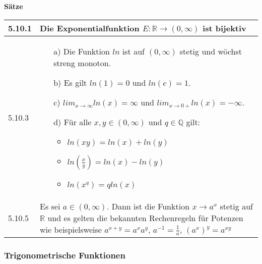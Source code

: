     \noindent 
    \textbf{Sätze}
    \begin{table}[H]
    \begin{tabularx}{\textwidth}{X m{16cm}}
        \toprule

        5.10.1& Die Exponentialfunktion $E: \mathbb{R} \rightarrow (0,\infty)$ ist \textbf{bijektiv} \\
        \midrule
        5.10.3& \begin{itemize}
                    \item[a)] Die Funktion $ln$ ist auf $(0, \infty)$ stetig und wöchst streng monoton.
                    \item[b)] Es gilt $ln(1) = 0$ und $ln(e) = 1$.
                    \item[c)] $lim_{x \rightarrow \infty} ln(x) = \infty$ und $lim_{x \rightarrow 0+} ln(x) = -\infty$.
                    \item[d)] Für alle $x, y \in (0, \infty)$ und $q \in \mathbb{Q}$ gilt:
                                \begin{itemize}
                                    \item $ln(xy) = ln(x) + ln(y)$
                                    \item $ln(\frac{x}{y}) = ln(x) - ln(y)$
                                    \item $ln(x^q) = q ln(x)$
                                \end{itemize} 
                \end{itemize} \\
        \midrule
        5.10.5& Es sei $a \in (0,\infty)$. Dann ist die Funktion $x \rightarrow a^x$ stetig auf $\mathbb{R}$ und es gelten die bekannten
                Rechenregeln für Potenzen wie beispielsweise $a^{x+y}=a^xa^y$, $a^{-1}=\frac{1}{a}$, $(a^x)^y=a^{xy}$ \\

        \bottomrule
    \end{tabularx}
    \end{table}

\subsubsection{Trigonometrische Funktionen}

